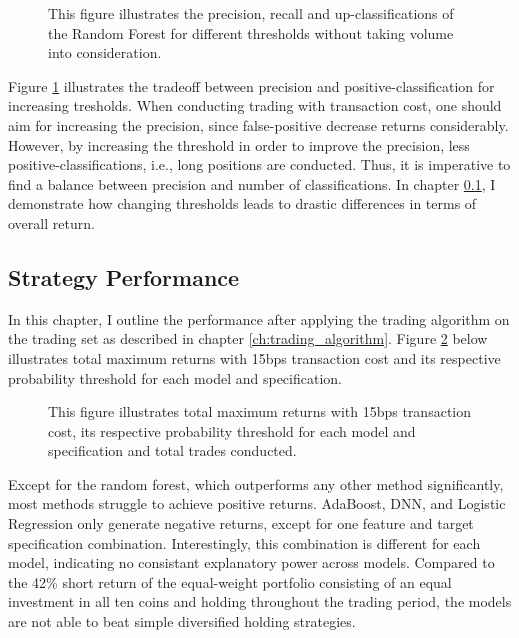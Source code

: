 \begin{figure}[H]
    \captionsetup{format=plain}
    \caption{ 
            This figure illustrates the precision, recall and up-classifications of the Random Forest for different thresholds
            without taking volume into consideration. 
        }
    \label{fig:rf_no_volume_future_2state_movement_120min_precision_vs_threshold}
\end{figure}


Figure \ref{fig:rf_no_volume_future_2state_movement_120min_precision_vs_threshold}
illustrates the tradeoff between precision and positive-classification for increasing tresholds.
When conducting trading with transaction cost, one should aim for increasing the precision, since false-positive decrease returns considerably.
However, by increasing the threshold in order to improve the precision, less positive-classifications, i.e., long positions are conducted.
Thus, it is imperative to find a balance between precision and number of classifications.
In chapter \ref{ch:strategy_performance}, I demonstrate how changing thresholds leads to drastic
differences in terms of overall return.




\subsection{Strategy Performance} \label{ch:strategy_performance}

In this chapter, I outline the performance after applying the trading algorithm on the 
trading set as described in chapter \ref{ch:trading_algorithm}.
Figure \ref{fig:all_max_returns_15bps} below illustrates total maximum returns with 15bps transaction cost 
and its respective probability threshold for each model and specification.

\begin{figure}[H]
    \captionsetup{format=plain}
    \caption{ 
            This figure illustrates total maximum returns with 15bps transaction cost, its respective probability threshold for each model and specification 
            and total trades conducted. 
        }
    \label{fig:all_max_returns_15bps}
\end{figure}

Except for the random forest, which outperforms any other method significantly, most methods struggle to achieve positive returns.
AdaBoost, DNN, and Logistic Regression only generate negative returns, except for one feature and target specification combination.
Interestingly, this combination is different for each model, indicating no consistant explanatory power across models.
Compared to the 42\% short return of the equal-weight portfolio consisting of an equal investment in all ten coins and holding throughout
the trading period, the models are not able to beat simple diversified holding strategies.

